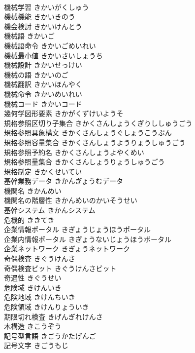\documentclass[8pt]{extreport}
\begin{document}
\begin{CJK}{UTF8}{min}
\\	機械学習	きかいがくしゅう	
\\	機械機能	きかいきのう	
\\	機会検討	きかいけんとう	
\\	機械語	きかいご	
\\	機械語命令	きかいごめいれい	
\\	機械最小値	きかいさいしょうち	
\\	機械設計	きかいせっけい	
\\	機械の語	きかいのご	
\\	機械翻訳	きかいほんやく	
\\	機械命令	きかいめいれい	
\\	機械コード	きかいコード	
\\	幾何学図形要素	きかがくずけいようそ	
\\	規格参照区切り子集合	きかくさんしょうくぎりししゅうごう	
\\	規格参照具象構文	きかくさんしょうぐしょうこうぶん	
\\	規格参照容量集合	きかくさんしょうようりょうしゅうごう	
\\	規格参照予約名	きかくさんしょうよやくめい	
\\	規格参照量集合	きかくさんしょうりょうしゅうごう	
\\	規格制定	きかくせいてい	
\\	基幹業務データ	きかんぎょうむデータ	
\\	機関名	きかんめい	
\\	機関名の階層性	きかんめいのかいそうせい	
\\	基幹システム	きかんシステム	
\\	危機的	ききてき	
\\	企業情報ポータル	きぎょうじょうほうポータル	
\\	企業内情報ポータル	きぎょうないじょうほうポータル	
\\	企業ネットワーク	きぎょうネットワーク	
\\	奇偶検査	きぐうけんさ	
\\	奇偶検査ビット	きぐうけんさビット	
\\	奇遇性	きぐうせい	
\\	危険域	きけんいき	
\\	危険地域	きけんちいき	
\\	危険領域	きけんりょういき	
\\	期限切れ検査	きげんぎれけんさ	
\\	木構造	きこうぞう	
\\	記号型言語	きごうかたげんご	
\\	記号文字	きごうもじ	

\end{CJK}
\end{document}
